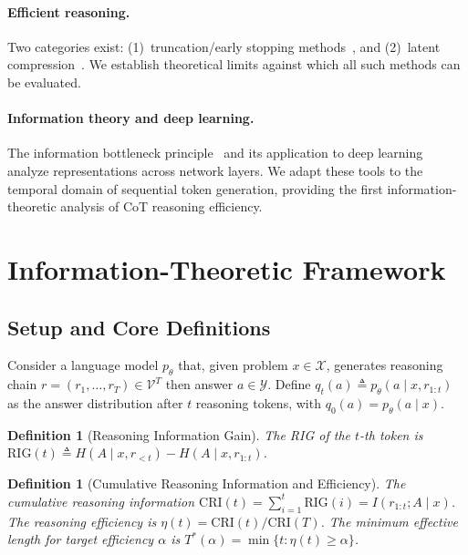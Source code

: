 \documentclass{article}
\newtheorem{definition}[theorem]{Definition}
\newcommand{\cX}{\mathcal{X}}
\newcommand{\cY}{\mathcal{Y}}
\newcommand{\cV}{\mathcal{V}}
\newcommand{\RIG}{\mathrm{RIG}}
\newcommand{\CRI}{\mathrm{CRI}}
\begin{document}
\paragraph{Efficient reasoning.}
Two categories exist: (1)~truncation/early stopping methods~\citep{quamar2025logitentropy, liu2025answerconvergence, han2025tokenbudget, zheng2025ars, zhang2025othink, fu2024certaindex}, and (2)~latent compression~\citep{xu2025softcot, tan2025thinksilently, kava2025}. We establish theoretical limits against which all such methods can be evaluated.

\paragraph{Information theory and deep learning.}
The information bottleneck principle~\citep{tishby2000information} and its application to deep learning~\citep{shwartzziv2017opening, hu2024surveyib} analyze representations across network layers. We adapt these tools to the temporal domain of sequential token generation, providing the first information-theoretic analysis of CoT reasoning efficiency.


\section{Information-Theoretic Framework}
\label{sec:theory}

\subsection{Setup and Core Definitions}
\label{sec:setup}

Consider a language model $p_\theta$ that, given problem $x \in \cX$, generates reasoning chain $r = (r_1, \ldots, r_T) \in \cV^T$ then answer $a \in \cY$. Define $q_t(a) \triangleq p_\theta(a \mid x, r_{1:t})$ as the answer distribution after $t$ reasoning tokens, with $q_0(a) = p_\theta(a \mid x)$.

\begin{definition}[Reasoning Information Gain]
\label{def:rig}
The RIG of the $t$-th token is $\RIG(t) \triangleq H(A \mid x, r_{<t}) - H(A \mid x, r_{1:t})$.
\end{definition}

\begin{definition}[Cumulative Reasoning Information and Efficiency]
\label{def:cri}
The cumulative reasoning information $\CRI(t) = \sum_{i=1}^t \RIG(i) = I(r_{1:t}; A \mid x)$. The reasoning efficiency is $\eta(t) = \CRI(t)/\CRI(T)$. The minimum effective length for target efficiency $\alpha$ is $T^*(\alpha) = \min\{t : \eta(t) \geq \alpha\}$.
\end{definition}
\end{document}
